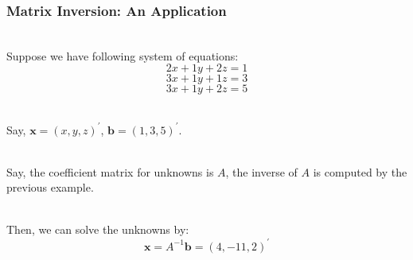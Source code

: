 \documentclass[handout]{beamer}
\numberwithin{equation}{section}
\begin{document}
\begin{frame}
\frametitle{Matrix Inversion: An Application}

\ \\Suppose we have following system of equations:
$$2 x + 1 y + 2 z = 1$$
$$3 x + 1 y + 1 z = 3$$
$$3 x + 1 y + 2 z = 5$$

\ \\Say, $\boldsymbol{x} = (x, y, z)^{'}$, $\boldsymbol{b} = (1, 3, 5)^{'}$.

\ \\Say, the coefficient matrix for unknowns is $A$, the inverse of $A$ is computed by the previous example.

\ \\Then, we can solve the unknowns by:
$$\boldsymbol{x} = A^{-1} \boldsymbol{b} = (4, -11, 2)^{'}$$

\end{frame}
\end{document}
